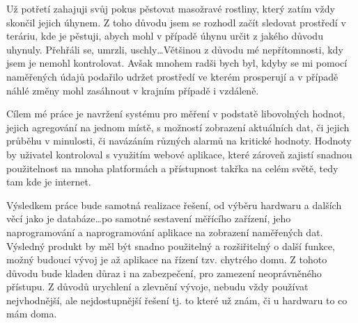 Už potřetí zahajuji svůj pokus pěstovat masožravé rostliny, který zatím vždy skončil jejich úhynem. Z toho důvodu jsem 
se rozhodl začít sledovat prostředí v teráriu, kde je pěstuji, abych mohl v případě úhynu určit z jakého důvodu uhynuly. 
Přehřáli se, umrzli, uschly\ldots Většinou z důvodu mé nepřítomnosti, kdy jsem je nemohl kontrolovat. Avšak mnohem radši 
bych byl, kdyby se mi pomocí naměřených údajů podařilo udržet prostředí ve kterém prosperují a v případě náhlé změny 
mohl zasáhnout v krajním případě i vzdáleně.

Cílem mé práce je navržení systému pro měření v podstatě libovolných hodnot, jejich agregování na jednom místě, 
s možností zobrazení aktuálních dat, či jejich průběhu v minulosti, či navázáním různých alarmů na kritické hodnoty. 
Hodnoty by uživatel kontroloval s využitím webové aplikace, které zároveň zajistí snadnou použitelnost na mnoha 
platformách a přístupnost takřka na celém světě, tedy tam kde je internet.

Výsledkem práce bude samotná realizace řešení, od výběru hardwaru a dalších věcí jako je databáze\ldots po samotné 
sestavení měřícího zařízení, jeho naprogramování a naprogramování aplikace na zobrazení naměřených dat. Výsledný produkt 
by měl být snadno použitelný a rozšiřitelný o další funkce, možný budoucí vývoj je až aplikace na řízení tzv. chytrého 
domu. Z tohoto důvodu bude kladen důraz i na zabezpečení, pro zamezení neoprávněného přístupu. Z důvodů urychlení 
a zlevnění vývoje, nebudu vždy používat nejvhodnější, ale nejdostupnější řešení tj. to které už znám, či u hardwaru to 
co mám doma.
